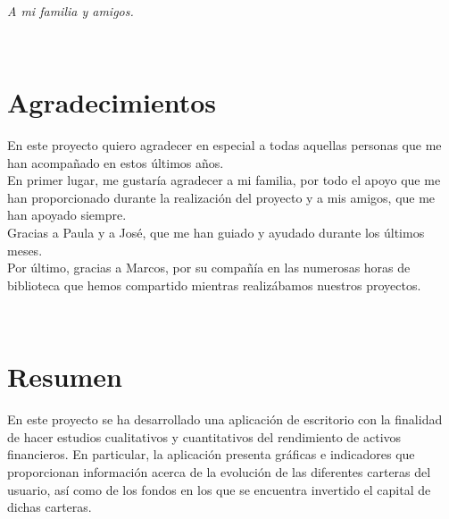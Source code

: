 \documentclass[12pt, a4paper]{book}
\begin{document}
\newpage
$\ $
\thispagestyle{empty} %

\chapter*{}
\setcounter{page}{3}
\begin{flushright}
	\textit{A mi familia y amigos.}
\end{flushright}

\newpage
$\ $
\thispagestyle{empty} %

\chapter*{Agradecimientos} %

En  este proyecto quiero agradecer en especial a todas aquellas personas que me han acompañado
en estos últimos años.\\

En primer lugar, me gustaría agradecer a mi familia, por todo el apoyo que me han proporcionado durante la realización del proyecto y a mis amigos, que me han apoyado siempre.\\

 Gracias a Paula y a José, que me han guiado y ayudado durante los últimos meses.\\
 
 Por último, gracias a Marcos, por su compañía en las numerosas horas de biblioteca que hemos compartido mientras realizábamos nuestros proyectos. 


\newpage
$\ $
\thispagestyle{empty} %

\chapter*{Resumen} %


En este proyecto se ha desarrollado una aplicación de escritorio con la finalidad de hacer estudios cualitativos y cuantitativos del rendimiento de activos financieros. En particular, la aplicación presenta gráficas e indicadores que proporcionan información acerca de la evolución de las diferentes carteras del usuario, así como de los fondos en los que se encuentra invertido el capital de dichas carteras. \\
\end{document}
